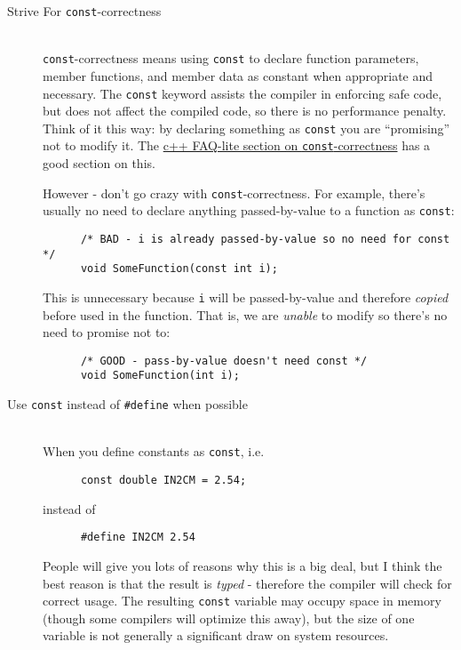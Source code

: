 \documentclass[11pt]{article}
\begin{document}
\begin{description}

  \item[Strive For {\tt const}-correctness] \hfill \\
    {\tt const}-correctness means using {\tt const} to declare function parameters, member functions, and member data as constant when appropriate and necessary.  The {\tt const} keyword assists the compiler in enforcing safe code, but does not affect the compiled code, so there is no performance penalty.  Think of it this way: by declaring something as {\tt const} you are ``promising'' not to modify it.  The \href{http://www.parashift.com/c++-faq-lite/const-correctness.html}{c++ FAQ-lite section on {\tt const}-correctness} has a good section on this.

    However - don't go crazy with {\tt const}-correctness.  For example, there's usually no need to declare anything passed-by-value to a function as {\tt const}:
    \begin{lstlisting}
      /* BAD - i is already passed-by-value so no need for const */
      void SomeFunction(const int i);
    \end{lstlisting}
    This is unnecessary because {\tt i} will be passed-by-value and therefore \textit{copied} before used in the function.  That is, we are \textit{unable} to modify so there's no need to promise not to:
    \begin{lstlisting}
      /* GOOD - pass-by-value doesn't need const */
      void SomeFunction(int i);
    \end{lstlisting}
    
  \item[Use {\tt const} instead of {\tt \#define} when possible] \hfill \\
    When you define constants as {\tt const}, i.e.
    \begin{lstlisting}
      const double IN2CM = 2.54;
    \end{lstlisting}
    instead of
    \begin{lstlisting}
      #define IN2CM 2.54
    \end{lstlisting}
    People will give you lots of reasons why this is a big deal, but I think the best reason is that the result is \textit{typed} - therefore the compiler will check for correct usage.  The resulting {\tt const} variable may occupy space in memory (though some compilers will optimize this away), but the size of one variable is not generally a significant draw on system resources.


\end{description}
\end{document}
